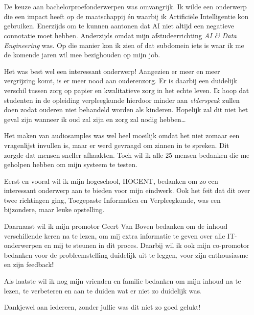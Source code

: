 
\chapter*{}
\label{ch:voorwoord}


De keuze aan bachelorproefonderwerpen was omvangrijk. Ik wilde een onderwerp die een impact heeft op de maatschappij én waarbij ik Artificiële Intelligentie kon gebruiken. Enerzijds om te kunnen aantonen dat AI niet altijd een negatieve connotatie moet hebben. Anderzijds omdat mijn afstudeerrichting \textit{AI \& Data Engineering} was. Op die manier kon ik zien of dat subdomein iets is waar ik me de komende jaren wil mee bezighouden op mijn job.

Het was best wel een interessant onderwerp! Aangezien er meer en meer vergrijzing komt, is er meer nood aan ouderenzorg. Er is daarbij een duidelijk verschil tussen zorg op papier en kwalitatieve zorg in het echte leven. Ik hoop dat studenten in de opleiding verpleegkunde hierdoor minder aan \textit{elderspeak} zullen doen zodat ouderen niet behandeld worden als kinderen. Hopelijk zal dit niet het geval zijn wanneer ik oud zal zijn en zorg zal nodig hebben\ldots


Het maken van audiosamples was wel heel moeilijk omdat het niet zomaar een vragenlijst invullen is, maar er werd gevraagd om zinnen in te spreken. Dit zorgde dat mensen sneller afhaakten. Toch wil ik alle 25 %
mensen bedanken die me geholpen hebben om mijn systeem te testen.

Eerst en vooral wil ik mijn hogeschool, HOGENT, bedanken om zo een interessant onderwerp aan te bieden voor mijn eindwerk. Ook het feit dat dit over twee richtingen ging, Toegepaste Informatica en Verpleegkunde, was een bijzondere, maar leuke opstelling.

Daarnaast wil ik mijn promotor Geert Van Boven bedanken om de inhoud verschillende keren na te lezen, om mij extra informatie te geven over alle IT-onderwerpen en mij te steunen in dit proces.
Daarbij wil ik ook mijn co-promotor bedanken voor de probleemstelling duidelijk uit te leggen, voor zijn enthousiasme en zijn feedback!

Als laatste wil ik nog mijn vrienden en familie bedanken om mijn inhoud na te lezen, te verbeteren en aan te duiden wat er niet zo duidelijk was.

Dankjewel aan iedereen, zonder jullie was dit niet zo goed gelukt!